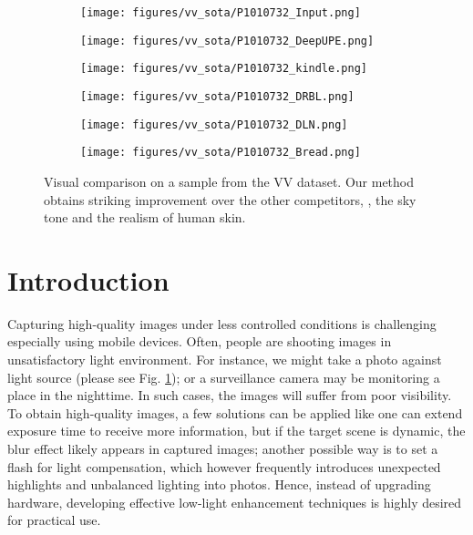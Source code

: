 \documentclass[10pt,twocolumn,letterpaper]{article}
\begin{document}
\begin{figure}[t]
\begin{subfigure}{0.32\linewidth}
    \texttt{[image: figures/vv\_sota/P1010732\_Input.png]}
\end{subfigure}
\begin{subfigure}{0.32\linewidth}
    \texttt{[image: figures/vv\_sota/P1010732\_DeepUPE.png]}
\end{subfigure}
\begin{subfigure}{0.32\linewidth}
    \texttt{[image: figures/vv\_sota/P1010732\_kindle.png]}
\end{subfigure}

\begin{subfigure}{0.32\linewidth}
    \texttt{[image: figures/vv\_sota/P1010732\_DRBL.png]}
\end{subfigure}
\begin{subfigure}{0.32\linewidth}
    \texttt{[image: figures/vv\_sota/P1010732\_DLN.png]}
\end{subfigure}
\begin{subfigure}{0.32\linewidth}
    \texttt{[image: figures/vv\_sota/P1010732\_Bread.png]}
\end{subfigure}

\caption{Visual comparison on a sample from the VV dataset. Our method obtains striking improvement over the other competitors, \eg, the sky tone and the realism of human skin.} 
\label{fig:tease}
\end{figure}

\section{Introduction}
\label{sec:introduction}
  Capturing high-quality images under less controlled conditions is challenging especially using mobile devices. Often, people are shooting images in unsatisfactory light environment. For instance, we might take a photo against light source (please see Fig. \ref{fig:tease}); or a surveillance camera may be monitoring a place in the nighttime. In such cases, the images will suffer from poor visibility. To obtain high-quality images, a few solutions can be applied like one can extend exposure time to receive more information, but if the target scene is dynamic, the blur effect likely appears in captured images; another possible way is to set a flash for light compensation, which however frequently introduces unexpected highlights and unbalanced lighting into photos. Hence, instead of upgrading hardware, developing effective low-light enhancement techniques is highly desired for practical use. 
\end{document}
